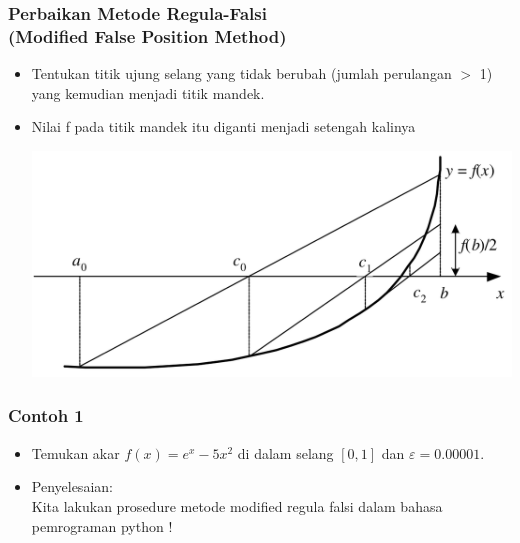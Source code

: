 \documentclass[pdflatex,compress]{beamer}
\begin{document}
\begin{frame}
	\frametitle{Perbaikan Metode Regula-Falsi \\ (Modified False Position Method)}
	\begin{itemize}
		\item Tentukan titik ujung selang yang tidak berubah (jumlah perulangan $ > $ 1) yang kemudian menjadi titik mandek.
		\item Nilai f pada titik mandek itu diganti menjadi setengah kalinya
		\begin{center}
			\includegraphics[height=0.5\textheight]{img/img12}
		\end{center}
	\end{itemize}
\end{frame}

\begin{frame}
	\frametitle{Contoh 1}
	\begin{itemize}
		\item Temukan akar $ f(x) = e^x - 5x^2 $ di dalam selang $ [0, 1] $ dan $ \varepsilon = 0.00001 $.
		\item Penyelesaian:\\Kita lakukan prosedure metode modified regula falsi dalam bahasa pemrograman python !
	\end{itemize}
\end{frame}
\end{document}
